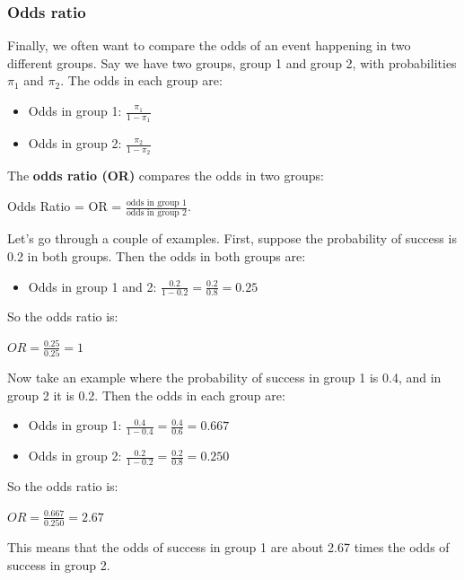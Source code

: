\documentclass[
  letterpaper,
  8pt,
  a4paper]{book}
\providecommand{\tightlist}{%
  \setlength{\itemsep}{0pt}\setlength{\parskip}{0pt}}
\begin{document}
\subsubsection*{Odds ratio}\label{odds-ratio}

Finally, we often want to compare the odds of an event happening in two
different groups. Say we have two groups, group 1 and group 2, with
probabilities \(\pi_1\) and \(\pi_2\). The odds in each group are:

\begin{itemize}
\tightlist
\item
  Odds in group 1: \(\frac{\pi_1}{1-\pi_1}\)
\item
  Odds in group 2: \(\frac{\pi_2}{1-\pi_2}\)
\end{itemize}

The \textbf{odds ratio (OR)} compares the odds in two groups:

Odds Ratio = OR =
\(\frac{\text{odds in group 1}}{\text{odds in group 2}}\).

Let's go through a couple of examples. First, suppose the probability of
success is 0.2 in both groups. Then the odds in both groups are:

\begin{itemize}
\tightlist
\item
  Odds in group 1 and 2: \(\frac{0.2}{1-0.2} = \frac{0.2}{0.8} = 0.25\)
\end{itemize}

So the odds ratio is:

\(OR = \frac{0.25}{0.25} = 1\)

Now take an example where the probability of success in group 1 is 0.4,
and in group 2 it is 0.2. Then the odds in each group are:

\begin{itemize}
\tightlist
\item
  Odds in group 1: \(\frac{0.4}{1-0.4} = \frac{0.4}{0.6} = 0.667\)
\item
  Odds in group 2: \(\frac{0.2}{1-0.2} = \frac{0.2}{0.8} = 0.250\)
\end{itemize}

So the odds ratio is:

\(OR = \frac{0.667}{0.250} = 2.67\)

This means that the odds of success in group 1 are about 2.67 times the
odds of success in group 2.
\end{document}

